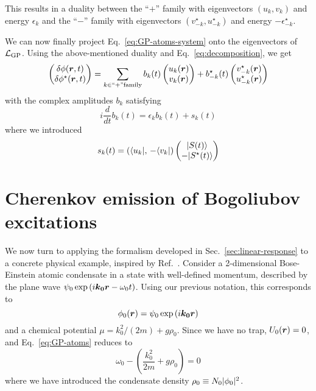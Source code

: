 This results in a duality between the ``$+$'' family with eigenvectors
$(u_k, v_k)$ and energy $\epsilon_k$ and the ``$-$'' family with
eigenvectors $(v_{-k}^{\star}, u_{-k}^{\star})$ and energy
$-\epsilon_{-k}^{\star}$.

We can now finally project Eq.~\eqref{eq:GP-atoms-system} onto the
eigenvectors of $\mathcal{L}_{\text{GP}}$. Using the above-mentioned duality and
Eq.~\eqref{eq:decomposition}, we get
%
\begin{equation}\label{eq:phi-column-expansion}
  \begin{pmatrix} \delta\phi(\bm{r},t)\\ \delta\phi^{\star}(\bm{r},t) \end{pmatrix} = \sum_{k \in ``+" \mbox{\scriptsize family}}
  b_k(t) \begin{pmatrix} u_k(\bm{r})\\ v_k(\bm{r}) \end{pmatrix}
  + b_{-k}^{\star}(t) \begin{pmatrix} v_{-k}^{\star}(\bm{r})\\ u_{-k}^{\star}(\bm{r}) \end{pmatrix}
\end{equation}
% 
with the complex amplitudes $b_k$ satisfying 
%
\begin{equation}\label{eq:amplitudes-bk}
  i \frac{d}{dt}b_k(t) = \epsilon_k b_k(t) + s_k(t)
\end{equation}
% 
where we introduced
%
\begin{equation}\label{eq:amplitudes-sk}
  s_k(t) = \left( \langle u_k \vert ,\, -\langle v_k \vert \right) \begin{pmatrix} \vert S(t) \rangle\\ -\vert S^{\star}(t) \rangle \end{pmatrix}
\end{equation}
% 

\section{Cherenkov emission of Bogoliubov excitations}
\label{sec:cherenkov-emission}


We now turn to applying the formalism developed in
Sec.~\ref{sec:linear-response} to a concrete physical example,
inspired by Ref.~\cite{Carusotto_2006}. Consider a 2-dimensional
Bose-Einstein atomic condensate in a state with well-defined momentum,
described by the plane wave
$\psi_0 \exp \left( i \bm{k_0} \bm{r} - \omega_0 t \right)$. Using our
previous notation, this corresponds to
%
\begin{equation}\label{eq:atom-initial}
  \phi_0(\bm{r}) = \psi_0 \exp \left( i \bm{k_0} \bm{r} \right)
\end{equation}
% 
and a chemical potential $\mu = k_0^2/(2m) + g \rho_0$. Since we
have no trap, $U_0(\bm{r})=0$, and Eq.~\eqref{eq:GP-atoms} reduces to
%
\begin{equation}\label{eq:atom-MF}
  \omega_0 - \left( \frac{k_0^2}{2m} + g \rho_0 \right) = 0
\end{equation}
% 
where we have introduced the condensate density
$\rho_0 \equiv N_0 \vert \phi_0 \vert^2$.  

